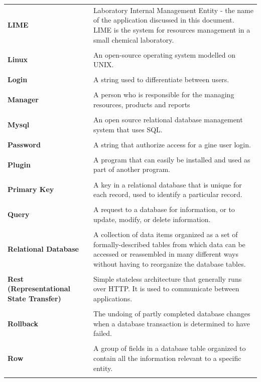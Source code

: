 \documentclass[a4paper,11pt,twoside]{report}
\theoremstyle{definition}
\begin{document}
\begin{longtable}{p{4cm} p{11cm}}
\textbf{LIME} & Laboratory Internal Management Entity - the name of the application discussed in this document. LIME is the system for resources management in a small chemical laboratory. \\ \\

\textbf{Linux} & An open-source operating system modelled on UNIX.\\ \\
\textbf{Login} & A string used to differentiate between users.\\ \\
\textbf{Manager} & A person who is responsible for the managing resources, products and reports\\ \\
\textbf{Mysql} & An open source relational database management system that uses SQL.\\ \\
\textbf{Password} & A string that authorize access for a gine user login.\\ \\
\textbf{Plugin} & A program that can easily be installed and used as part of another program.\\ \\
\textbf{Primary Key} & A key in a relational database that is unique for each record, used to identify a particular record.\\ \\
\textbf{Query} & A request to a database for information, or to update, modify, or delete information.\\ \\
\textbf{Relational Database} & A collection of data items organized as a set of formally-described tables from which data can be accessed or reassembled in many different ways without having to reorganize the database tables.\\ \\
\textbf{Rest (Representational State Transfer)} & Simple stateless architecture that generally runs over HTTP. It is used to communicate between applications.\\ \\
\textbf{Rollback} & The undoing of partly completed database changes when a database transaction is determined to have failed.\\ \\
\textbf{Row} & A group of fields in a database table organized to contain all the information relevant to a specific entity.\\ \\

\end{longtable}
\end{document}
